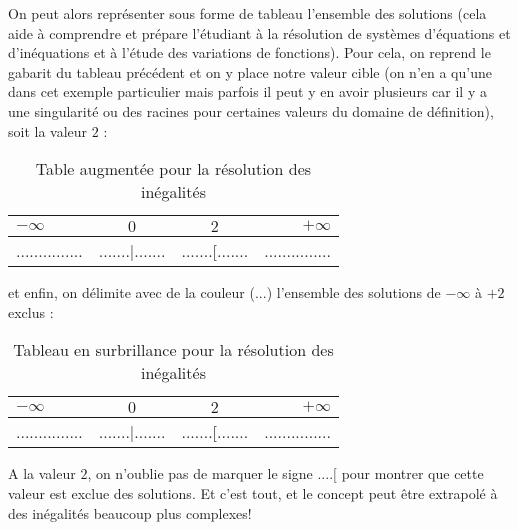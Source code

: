 \begin{tcolorbox}[colframe=black,colback=white,sharp corners]
	On peut alors représenter sous forme de tableau l'ensemble des solutions (cela aide à comprendre et prépare l'étudiant à la résolution de systèmes d'équations et d'inéquations et à l'étude des variations de fonctions). Pour cela, on reprend le gabarit du tableau précédent et on y place notre valeur cible (on n'en a qu'une dans cet exemple particulier mais parfois il peut y en avoir plusieurs car il y a une singularité ou des racines pour certaines valeurs du domaine de définition), soit la valeur $2$ :
	\begin{table}[H]
		\begin{center}
		\begin{tabular}{|l|c|c|r|}
		\hline 
		{\cellcolor{black!30}$-\infty$} & {\cellcolor{black!30}$0$} & {\cellcolor{black!30}$2$} & {\cellcolor{black!30}$+\infty$}\\ 
		\hline 
		............... & .......|....... & .......[....... & ............... \\  
		\hline 
		\end{tabular} 
		\end{center}
		\caption{Table augmentée pour la résolution des inégalités}
	\end{table}
	et enfin, on délimite avec de la couleur (...) l'ensemble des solutions de $-\infty$ à $+2$ exclus :
	\begin{table}[H]
		\begin{center}
		\begin{tabular}{|l|c|c|r|}
		\hline 
		{\cellcolor{black!30}$-\infty$} & {\cellcolor{black!30}$0$} & {\cellcolor{black!30}$2$} & {\cellcolor{black!30}$+\infty$}\\ 
		\hline 
		{\cellcolor{green!30}...............} & {\cellcolor{green!30}.......|.......}  & {\cellcolor{green!30}.......[.......} & ............... \\  
		\hline 
		\end{tabular} 
		\end{center}
		\caption{Tableau en surbrillance pour la résolution des inégalités}
	\end{table}
	A la valeur $2$, on n'oublie pas de marquer le signe $....[$ pour montrer que cette valeur est exclue des solutions. Et c'est tout, et le concept peut être extrapolé à des inégalités beaucoup plus complexes!
	\end{tcolorbox}

